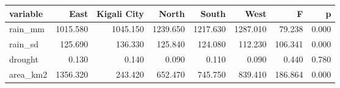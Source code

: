 \begin{tabular}{lrrrrrrr}
\toprule
variable & East & Kigali City & North & South & West & F & p \\
\midrule
rain\_mm & 1015.580 & 1045.150 & 1239.650 & 1217.630 & 1287.010 & 79.238 & 0.000 \\
rain\_sd & 125.690 & 136.330 & 125.840 & 124.080 & 112.230 & 106.341 & 0.000 \\
drought & 0.130 & 0.140 & 0.090 & 0.110 & 0.090 & 0.440 & 0.780 \\
area\_km2 & 1356.320 & 243.420 & 652.470 & 745.750 & 839.410 & 186.864 & 0.000 \\
\bottomrule
\end{tabular}
